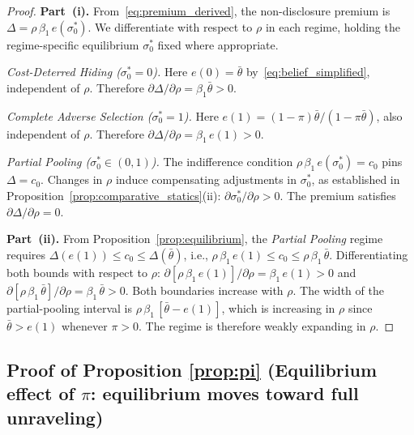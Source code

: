 \documentclass[10pt,letterpaper]{bp-template-concise}
\begin{document}
\begin{proof}
\textbf{Part~(i).}
From~\eqref{eq:premium_derived}, the non-disclosure premium is $\Delta = \rho\,\beta_1\,e(\sigma_0^*)$. We differentiate with respect to $\rho$ in each regime, holding the regime-specific equilibrium $\sigma_0^*$ fixed where appropriate.

\medskip
\textit{Cost-Deterred Hiding ($\sigma_0^* = 0$).} Here $e(0) = \bar{\theta}$ by~\eqref{eq:belief_simplified}, independent of $\rho$. Therefore $\partial\Delta/\partial\rho = \beta_1\bar{\theta} > 0$.

\textit{Complete Adverse Selection ($\sigma_0^* = 1$).} Here $e(1) = (1-\pi)\bar{\theta}/(1-\pi\bar{\theta})$, also independent of $\rho$. Therefore $\partial\Delta/\partial\rho = \beta_1\,e(1) > 0$.

\textit{Partial Pooling ($\sigma_0^*\in(0,1)$).} The indifference condition $\rho\,\beta_1\,e(\sigma_0^*) = c_0$ pins $\Delta = c_0$. Changes in $\rho$ induce compensating adjustments in $\sigma_0^*$, as established in Proposition~\ref{prop:comparative_statics}(ii): $\partial\sigma_0^*/\partial\rho > 0$. The premium satisfies $\partial\Delta/\partial\rho = 0$.

\medskip
\textbf{Part~(ii).}
From Proposition~\ref{prop:equilibrium}, the \emph{Partial Pooling} regime requires $\Delta(e(1)) \leq c_0 \leq \Delta(\bar{\theta})$, i.e., $\rho\,\beta_1\,e(1) \leq c_0 \leq \rho\,\beta_1\,\bar{\theta}$. Differentiating both bounds with respect to $\rho$: $\partial[\rho\,\beta_1\,e(1)]/\partial\rho = \beta_1\,e(1) > 0$ and $\partial[\rho\,\beta_1\,\bar{\theta}]/\partial\rho = \beta_1\,\bar{\theta} > 0$. Both boundaries increase with $\rho$. The width of the partial-pooling interval is $\rho\,\beta_1\,[\bar{\theta} - e(1)]$, which is increasing in $\rho$ since $\bar{\theta} > e(1)$ whenever $\pi > 0$. The regime is therefore weakly expanding in $\rho$.
\end{proof}

\subsection*{Proof of Proposition \ref{prop:pi} (Equilibrium effect of $\pi$: equilibrium moves toward full unraveling)}
\end{document}
